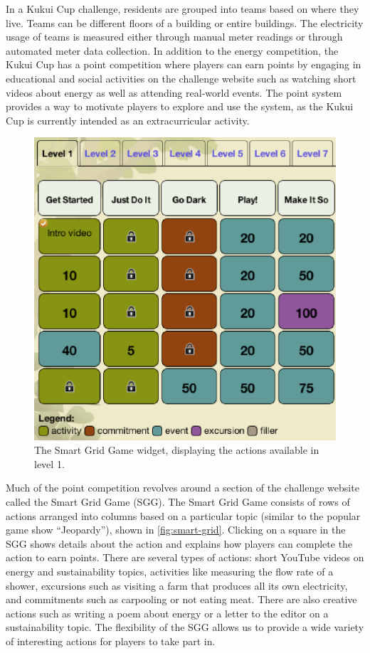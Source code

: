 \documentclass{sigchi}
\begin{document}
In a Kukui Cup challenge, residents are grouped into teams based on where they live. Teams can be different floors of a building or entire buildings. The electricity usage of teams is measured either through manual meter readings or through automated meter data collection. In addition to the energy competition, the Kukui Cup has a point competition where players can earn points by engaging in educational and social activities on the challenge website such as watching short videos about energy as well as attending real-world events. The point system provides a way to motivate players to explore and use the system, as the Kukui Cup is currently intended as an extracurricular activity.

\begin{figure}[!t]
\centering
\includegraphics[width=0.95\columnwidth]{smart-grid.eps}
\caption{The Smart Grid Game widget, displaying the actions available in level 1.}
\label{fig:smart-grid}
\end{figure}

Much of the point competition revolves around a section of the challenge website called the Smart Grid Game (SGG). The Smart Grid Game consists of rows of actions arranged into columns based on a particular topic (similar to the popular game show ``Jeopardy''), shown in \autoref{fig:smart-grid}. Clicking on a square in the SGG shows details about the action and explains how players can complete the action to earn points. There are several types of actions: short YouTube videos on energy and sustainability topics, activities like measuring the flow rate of a shower, excursions such as visiting a farm that produces all its own electricity, and commitments such as carpooling or not eating meat. There are also creative actions such as writing a poem about energy or a letter to the editor on a sustainability topic. The flexibility of the SGG allows us to provide a wide variety of interesting actions for players to take part in.
\end{document}
